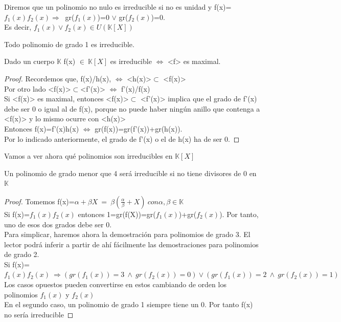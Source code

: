 \documentclass[nochap]{apuntes}
\begin{document}
\begin{defn}
 Diremos que un polinomio no nulo es irreducible si no es unidad y f(x)=$f_1(x)f_2(x) \Rightarrow \ $  gr($f_1(x)$)=0 $\vee$  gr($f_2(x)$)=0.\\
 Es decir, $f_1(x) \vee f_2(x) \in U(\mathbb{K}[X])$
\end{defn}
Todo polinomio de grado 1 es irreducible.
\begin{lemma}
 Dado un cuerpo $\mathbb{K}$  f(x) $\in \ \mathbb{K}[X]$  es irreducible $\Leftrightarrow$  <f> es maximal.
\end{lemma}
\begin{proof}
 Recordemos que, f(x)/h(x), $\Leftrightarrow$  <h(x)>$\subset$  <f(x)>\\
 Por otro lado <f(x)>$\subset$<f'(x)> $\Leftrightarrow$  f'(x)/f(x)\\
 Si <f(x)> es maximal, entonces <f(x)>$\subset$ <f'(x)> implica que el grado de f'(x) debe ser 0 o igual al de f(x), porque no puede haber
 ningún anillo que contenga a <f(x)> y lo mismo ocurre con <h(x)>\\
 Entonces f(x)=f'(x)h(x) $\Leftrightarrow$  gr(f(x))=gr(f'(x))+gr(h(x)).\\
 Por lo indicado anteriormente, el grado de f'(x) o el de h(x) ha de ser 0.
\end{proof}

Vamos a ver ahora qué polinomios son irreducibles en $\mathbb{K}[X]$\\
\begin{lemma}
 Un polinomio de grado menor que 4 será irreducible si no tiene divisores de 0 en $\mathbb{K}$
\end{lemma}
\begin{proof}
 Tomemos f(x)=$\alpha + \beta X \ = \ \beta(\frac{\alpha}{\beta}+X) \ con \alpha,\beta \in \mathbb{K}$\\
 Si f(x)=$f_1(x)f_2(x)$  entonces 1=gr(f(X))=gr($f_1(x)$)+gr($f_2(x)$). Por tanto, uno de esos dos grados debe ser 0.\\
 
 Para simplicar, haremos ahora la demostración para polinomios de grado 3. El lector podrá inferir a partir de ahí fácilmente las demostraciones
 para polinomios de grado 2.\\
 Si f(x)=$f_1(x)f_2(x) \ \Rightarrow (gr(f_1(x))=3 \ \wedge \ gr(f_2(x))=0) \vee (gr(f_1(x))=2 \ \wedge \ gr(f_2(x))=1)$\\
 Los casos opuestos pueden convertirse en estos cambiando de orden los polinomios $f_1(x)$  y $f_2(x)$\\
 
 En el segundo caso, un polinomio de grado 1 siempre tiene un 0. Por tanto f(x) no sería irreducible
\end{proof}
\end{document}

